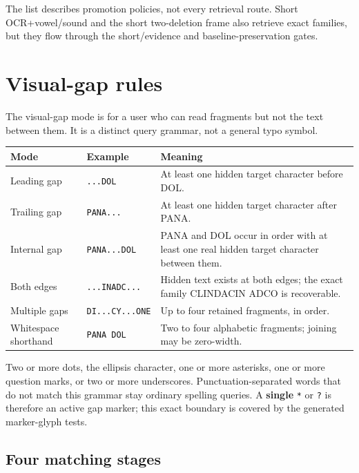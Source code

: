 \documentclass[10pt,a4paper]{article}
\newcommand{\observed}[1]{\texttt{#1}}
\begin{document}
The list describes promotion policies, not every retrieval route. Short
OCR+vowel/sound and the short two-deletion frame also retrieve exact families,
but they flow through the short/evidence and baseline-preservation gates.

\section{Visual-gap rules}

The visual-gap mode is for a user who can read fragments but not the text
between them. It is a distinct query grammar, not a general typo symbol.

\begin{tabularx}{\textwidth}{@{}L{32mm}L{43mm}Y@{}}
\toprule
Mode & Example & Meaning \\
\midrule
Leading gap & \observed{...DOL} & At least one hidden target character before DOL. \\
Trailing gap & \observed{PANA...} & At least one hidden target character after PANA. \\
Internal gap & \observed{PANA...DOL} & PANA and DOL occur in order with at least one real hidden target character between them. \\
Both edges & \observed{...INADC...} & Hidden text exists at both edges; the exact family CLINDACIN ADCO is recoverable. \\
Multiple gaps & \observed{DI...CY...ONE} & Up to four retained fragments, in order. \\
Whitespace shorthand & \observed{PANA DOL} & Two to four alphabetic fragments; joining may be zero-width. \\
\bottomrule
\end{tabularx}

\begin{takeaway}[title=Accepted explicit markers]
Two or more dots, the ellipsis character, one or more asterisks, one or more
question marks, or two or more underscores. Punctuation-separated words that
do not match this grammar stay ordinary spelling queries. A \textbf{single}
\observed{*} or \observed{?} is therefore an active gap marker; this exact
boundary is covered by the generated marker-glyph tests.
\end{takeaway}

\subsection{Four matching stages}
\end{document}
